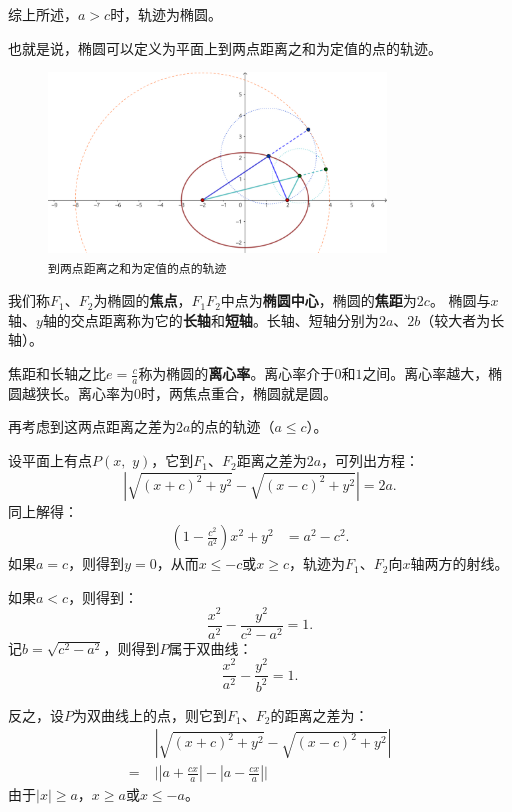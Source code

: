 \documentclass[12pt,UTF8]{ctexbook}
\theoremstyle{definition}
\theoremstyle{plain}
\begin{document}
综上所述，$a>c$时，轨迹为椭圆。

也就是说，椭圆可以定义为平面上到两点距离之和为定值的点的轨迹。

\begin{figure}[h] 
    \centering
    \includegraphics[width=0.8\textwidth]{tu/椭圆第一定义.png}
    \caption*{\texttt{到两点距离之和为定值的点的轨迹}}
\end{figure}

我们称$F_1$、$F_2$为椭圆的\textbf{焦点}，$F_1F_2$中点为\textbf{椭圆中心}，椭圆的\textbf{焦距}为$2c$。
椭圆与$x$轴、$y$轴的交点距离称为它的\textbf{长轴}和\textbf{短轴}。长轴、短轴分别为$2a$、$2b$（较大者为长轴）。

焦距和长轴之比$\displaystyle e =\frac{c}{a}$称为椭圆的\textbf{离心率}。离心率介于$0$和$1$之间。离心率越大，椭圆越狭长。离心率为$0$时，两焦点重合，椭圆就是圆。

再考虑到这两点距离之差为$2a$的点的轨迹（$a\leqslant c$）。

设平面上有点$P(x, \,\,y)$，它到$F_1$、$F_2$距离之差为$2a$，可列出方程：
$$ \left|\sqrt{(x + c)^2 + y^2} - \sqrt{(x - c)^2 + y^2}\right| = 2a.$$
同上解得：
\begin{align*}
    \left(1 - \frac{c^2}{a^2}\right)x^2 + y^2 &= a^2 - c^2.
\end{align*}
如果$a = c$，则得到$y = 0$，从而$x \leqslant -c$或$x \geqslant c$，轨迹为$F_1$、$F_2$向$x$轴两方的射线。

如果$a < c$，则得到：
$$ \frac{x^2}{a^2} - \frac{y^2}{c^2 - a^2} = 1.$$
记$b = \sqrt{c^2 - a^2}$，则得到$P$属于双曲线：
$$ \frac{x^2}{a^2} - \frac{y^2}{b^2} = 1.$$

反之，设$P$为双曲线上的点，则它到$F_1$、$F_2$的距离之差为：
\begin{align*}
    &\;\left|\sqrt{(x + c)^2 + y^2} - \sqrt{(x - c)^2 + y^2}\right|  \\
    =&\; \Bigg|\left|a + \frac{cx}{a}\right| - \left|a - \frac{cx}{a}\right|\Bigg|
\end{align*}
由于$|x| \geqslant a$，$x \geqslant a$或$x \leqslant -a$。
\end{document}
